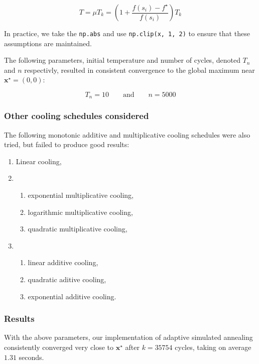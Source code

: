 \documentclass[11pt,oneside]{article}
\newcommand{\vect}[1]{\boldsymbol{#1}}
\begin{document}
\begin{equation}
    T = \mu T_k =
    \left( 1 + \frac{f(s_i)-f^\star}{f(s_i)}\right)T_k
\end{equation}

In practice, we take the \texttt{np.abs} and use \texttt{np.clip(x, 1, 2)}
to ensure that these assumptions are maintained.

The following parameters, initial temperature and number of cycles, denoted 
$T_n$ and $n$ respectivly, resulted in consistent convergence to the global maximum
near $\vect{x}^\star=(0,0)$:

$$
T_n = 10\quad\quad\text{and}\quad\quad n = 5000
$$

\subsubsection{Other cooling schedules considered}

 The following monotonic additive and multiplicative
cooling schedules were also tried, but failed to produce good results:

\begin{enumerate}
    \item Linear cooling,
    \item 
    \begin{enumerate}
        \item exponential multiplicative cooling,
        \item logarithmic multiplicative cooling,
        \item quadratic multiplicative cooling,
    \end{enumerate}
    \item
        \begin{enumerate}
            \item linear additive cooling,
            \item quadratic aditive cooling,
            \item exponential additive cooling.
        \end{enumerate}
\end{enumerate}

\subsubsection{Results}

With the above parameters, our implementation of adaptive simulated annealing 
consistently converged
very close to $\vect{x}^\star$ after $k=35754$ cycles, taking on average $1.31$ seconds.
\end{document}
